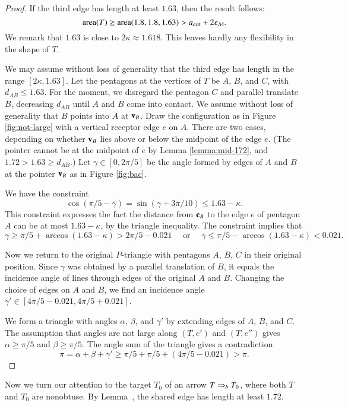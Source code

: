 \begin{proof}  
  If the third edge has length at least $1.63$, then the result
  follows:
\[
{\operatorname{area}}(T) \ge {\operatorname{area}}(1.8,1.8,1.63) > a_\text{crit} + 2\epsilon_{\mathcal M}.
\]
We remark that $1.63$ is close to $2\kappa\approx 1.618$.  This leaves hardly
any flexibility in the shape of $T$.

We may assume without loss of generality that the third edge has
length in the range $[2\kappa,1.63]$.  Let the pentagons at the
vertices of $T$ be $A$, $B$, and $C$, with $d_{AB}\le 1.63$.  For the
moment, we disregard the pentagon $C$ and parallel translate $B$,
decreasing $d_{AB}$ until $A$ and $B$ come into contact.  We assume
without loss of generality that $B$ points into $A$ at ${\mathbf v}_B$.  Draw
the configuration as in Figure \ref{fig:not-large} with a vertical
receptor edge $e$ on $A$.  There are two cases, depending on whether
${\mathbf v}_B$ lies above or below the midpoint of the edge $e$.  (The pointer
cannot be at the midpoint of $e$ by Lemma \ref{lemma:mid-172}, and
$1.72 > 1.63 \ge d_{AB}$.)  Let $\gamma\in[0,2\pi/5]$ be the angle
formed by edges of $A$ and $B$ at the pointer ${\mathbf v}_B$ as in Figure
\ref{fig:bac}.

We have the constraint
\[
\cos(\pi/5 - \gamma) =\sin(\gamma+3\pi/10) \le 1.63 - \kappa.
\]
This constraint expresses the fact the distance from ${\mathbf c}_B$ to the
edge $e$ of pentagon $A$ can be at most $1.63-\kappa$, by the triangle
inequality.  The constraint implies that
\[
\gamma \ge \pi/5 +
\arccos (1.63-\kappa) > 2\pi/5 - 0.021\quad \text{ or }\quad
%
\gamma\le \pi/5 - \arccos(1.63-\kappa) < 0.021.
\]

Now we return to the original $P$-triangle with pentagons $A$, $B$,
$C$ in their original position.  Since $\gamma$ was obtained by a
parallel translation of $B$, it equals the incidence angle of lines
through edges of the original $A$ and $B$.  Changing the choice of
edges on $A$ and $B$, we find an incidence angle  $\gamma' \in
[4\pi/5-0.021,4\pi/5+0.021]$.

We form a triangle with angles $\alpha$, $\beta$, and $\gamma'$ by
extending edges of $A$, $B$, and $C$.  The assumption that angles are
not large along $(T,e')$ and $(T,e'')$ gives $\alpha\ge \pi/5$ and
$\beta\ge \pi/5$.  The angle sum of the triangle gives a contradiction
\[
\pi=\alpha+\beta+\gamma' 
\ge  \pi/5 + \pi/5 + (4\pi/5 - 0.021) > \pi.
\]

\end{proof}


Now we turn our attention to the target $T_0$ of an arrow $T\Rightarrow_{b} T_0$,
where both $T$ and $T_0$ are nonobtuse.  By
Lemma~, the shared edge has length at least
$1.72$.


